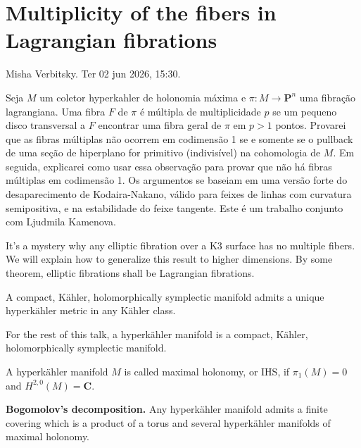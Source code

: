 \section{Multiplicity of the fibers in
Lagrangian fibrations}
\label{section-multiplicity-fibers-
lagrangian-fibrations}

\noindent
Misha Verbitsky.
Ter 02 jun 2026, 15:30.

\medskip\noindent
Seja \(M\) um coletor hyperkahler de
holonomia m\'axima e
\(\pi : M \to \mathbf{P}^n\) uma fibração
lagrangiana. Uma fibra \(F\) de \(\pi\) \'
e m\'ultipla de multiplicidade \(p\) se um
pequeno disco transversal a \(F\) encontrar
uma fibra geral de \(\pi\) em \(p > 1\)
pontos. Provarei que as fibras m\'ultiplas
n\~ao ocorrem em codimens\~ao 1 se e
somente se o pullback de uma se\c{c}\~ao de
hiperplano for primitivo (indivis\'ivel) na
cohomologia de \(M\). Em seguida,
explicarei como usar essa observa\c{c}\~ao
para provar que n\~ao h\'a fibras m\'ultiplas
em codimens\~ao 1. Os argumentos se
baseiam em uma vers\~ao forte do
desaparecimento de Kodaira-Nakano, v\'alido
para feixes de linhas com curvatura
semipositiva, e na estabilidade do feixe
tangente. Este \'{e} um trabalho conjunto
com Ljudmila Kamenova.

\medskip\noindent
It's a mystery why any elliptic fibration
over a K3 surface has no multiple fibers.
We will explain how to generalize this result
to higher dimensions. By some
theorem, elliptic fibrations shall
be Lagrangian fibrations.

\medskip\noindent

\begin{theorem}
\label{theorem-calabi-yau}
A compact, K\"ahler, holomorphically
symplectic manifold admits a unique
hyperk\"ahler metric in any K\"ahler class.
\end{theorem}

\begin{definition}
\label{definition-hyperkahler-manifold}
For the rest of this talk, a hyperk\"ahler
manifold is a compact, K\"ahler,
holomorphically symplectic manifold.
\end{definition}

\begin{definition}
\label{definition-maximal-holonomy}
A hyperk\"ahler manifold \(M\) is called
maximal holonomy, or IHS, if
\(\pi_1(M)=0\) and \(H^{2,0}(M)=\mathbf{C}\).
\end{definition}

\medskip\noindent
\textbf{Bogomolov's decomposition.}
Any hyperk\"ahler manifold admits a finite
covering which is a product of a torus and
several hyperk\"ahler manifolds of maximal
holonomy.

